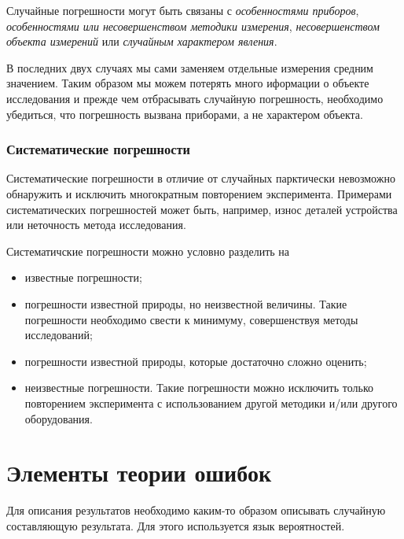 \documentclass[12pt]{article}
\begin{document}
        Случайные погрешности могут быть связаны с \textit{особенностями приборов},
        \textit{особенностями или несовершенством методики измерения},
        \textit{несовершенством объекта измерений} или \textit{случайным характером явления}.

        В последних двух случаях мы сами заменяем отдельные измерения средним значением.
        Таким образом мы можем потерять много иформации о объекте исследования и
        прежде чем отбрасывать случайную погрешность, необходимо убедиться, что
        погрешность вызвана приборами, а не характером объекта.

      \subsubsection{Систематические погрешности}

        Систематические погрешности в отличие от случайных парктически невозможно
        обнаружить и исключить многократным повторением эксперимента. Примерами систематических
        погрешностей может быть, например, износ деталей устройства или неточность
        метода исследования.

        Систематичские погрешности можно условно разделить на

        \begin{itemize}

          \item известные погрешности;

          \item погрешности известной природы, но неизвестной величины. Такие погрешности
          необходимо свести к минимуму, совершенствуя методы исследований;

          \item погрешности известной природы, которые достаточно сложно оценить;

          \item неизвестные погрешности. Такие погрешности можно исключить только
          повторением эксперимента с использованием другой методики и/или другого
          оборудования.

        \end{itemize}

  \section{Элементы теории ошибок}

    Для описания результатов необходимо каким-то образом описывать случайную
    составляющую результата. Для этого используется язык вероятностей.
\end{document}
